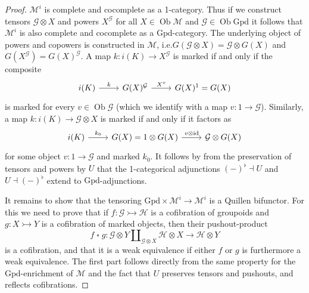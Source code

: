 \documentclass{article}
\theoremstyle{remark}
\theoremstyle{definition}
\begin{document}
\begin{proof}
  $\mathcal{M}^i$ is complete and cocomplete as a 1-category.
  Thus if we construct tensors $\mathcal{G} \otimes X$ and powers $X^\mathcal{G}$ for all $X \in \operatorname{Ob} \mathcal{M}$ and $\mathcal{G} \in \operatorname{Ob} \mathrm{Gpd}$ it follows that $\mathcal{M}^i$ is also complete and cocomplete as a $\mathrm{Gpd}$-category.
  The underlying object of powers and copowers is constructed in $\mathcal{M}$, i.e.\@ $G(\mathcal{G} \otimes X) = \mathcal{G} \otimes G(X)$ and $G(X^\mathcal{G}) = G(X)^\mathcal{G}$.
  A map $k : i(K) \rightarrow X^\mathcal{G}$ is marked if and only if the composite
  \begin{equation}
    \begin{tikzcd}
      i(K) \arrow[r, "k"] & G(X)^\mathcal{G} \arrow[r, "X^v"] & G(X)^1 = G(X)
    \end{tikzcd}
  \end{equation}
  is marked for every $v \in \operatorname{Ob} \mathcal{G}$ (which we identify with a map $v : 1 \rightarrow \mathcal{G}$).
  Similarly, a map $k : i(K) \rightarrow \mathcal{G} \otimes X$ is marked if and only if it factors as
  \begin{equation}
    \begin{tikzcd}
      i(K) \arrow[r, "k_0"] & G(X) = 1 \otimes G(X) \arrow[r, "v \mathbin{\otimes} \mathrm{id}"] & \mathcal{G} \otimes G(X)
    \end{tikzcd}
  \end{equation}
  for some object $v : 1 \rightarrow \mathcal{G}$ and marked $k_0$.
  It follows by \cite[Theorem 4.85]{basic-concepts-of-enriched-category-theory} from the preservation of tensors and powers by $U$ that the 1-categorical adjunctions $(-)^\flat \dashv U$ and $U \dashv (-)^\flat$ extend to $\mathrm{Gpd}$-adjunctions.

  It remains to show that the tensoring $\mathrm{Gpd} \times \mathcal{M}^i \rightarrow \mathcal{M}^i$ is a Quillen bifunctor.
  For this we need to prove that if $f : \mathcal{G} \rightarrowtail \mathcal{H}$ is a cofibration of groupoids and $g : X \rightarrowtail Y$ is a cofibration of marked objects, then their pushout-product
  \begin{equation}
    f \mathbin{\square} g : \mathcal{G} \otimes Y \amalg_{\mathcal{G} \otimes X} \mathcal{H} \otimes X \rightarrow \mathcal{H} \otimes Y
  \end{equation}
  is a cofibration, and that it is a weak equivalence if either $f$ or $g$ is furthermore a weak equivalence.
  The first part follows directly from the same property for the $\mathrm{Gpd}$-enrichment of $\mathcal{M}$ and the fact that $U$ preserves tensors and pushouts, and reflects cofibrations.


\end{proof}
\end{document}
